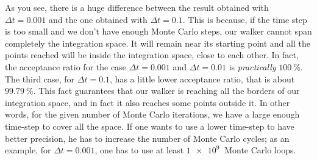 As you see, there is a huge difference between the result obtained with $\Delta t = 0.001$ and the one obtained with $\Delta t = 0.1$. This is because, if the time step is too small and we don't have enough Monte Carlo steps, our walker cannot span completely the integration space. It will remain near its starting point and all the points reached will be inside the integration space, close to each other. In fact, the acceptance ratio for the case $\Delta t = 0.001$ and $\Delta t = 0.01$ is \emph{practically} $\SI{100}{\percent}$. The third case, for $\Delta t = 0.1$, has a little lower acceptance ratio, that is about $\SI{99.79}{\percent}$. This fact guarantees that our walker is reaching all the borders of our integration space, and in fact it also reaches some points outside it. In other words, for the given number of Monte Carlo iterations, we have a large enough time-step to cover all the space. If one wants to use a lower time-step to have better precision, he has to increase the number of Monte Carlo cycles; as an example, for $\Delta t = 0.001$, one has to use at least $\SI{1e9}{}$ Monte Carlo loops.